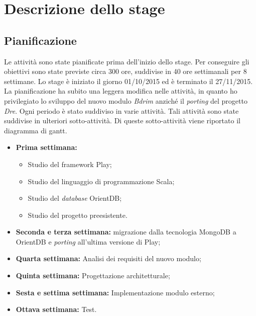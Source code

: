 
\chapter{Descrizione dello stage}
\label{cap:descrizione-stage}


\section{Pianificazione}
Le attività sono state pianificate prima dell'inizio dello stage. Per conseguire gli obiettivi sono state previste circa 300 ore, suddivise in 40 ore settimanali per 8 settimane. Lo stage è iniziato il giorno 01/10/2015 ed è terminato il 27/11/2015. La pianificazione ha subito una leggera modifica nelle attività, in quanto ho privilegiato lo sviluppo del nuovo modulo \textit{Bdrim} anziché il \textit{porting} del progetto \textit{Dre}. Ogni periodo è stato suddiviso in varie attività. Tali attività sono state suddivise in ulteriori sotto-attività. Di queste sotto-attività viene riportato il diagramma di \gls{gantt}.
\begin{itemize}
	\item \textbf{Prima settimana:}
	\begin{itemize}
		\item Studio del \gls{framework} Play;
		\item Studio del linguaggio di programmazione Scala;
		\item Studio del \textit{database} OrientDB;
		\item Studio del progetto preesistente.
	\end{itemize}
	\item \textbf{Seconda e terza settimana: }migrazione dalla tecnologia MongoDB a OrientDB e \textit{porting} all'ultima versione di Play;
	\item \textbf{Quarta settimana:} Analisi dei requisiti del nuovo modulo;
	\item \textbf{Quinta settimana:} Progettazione architetturale;
	\item \textbf{Sesta e settima settimana:} Implementazione modulo esterno;
	\item \textbf{Ottava settimana:} Test.
\end{itemize}

